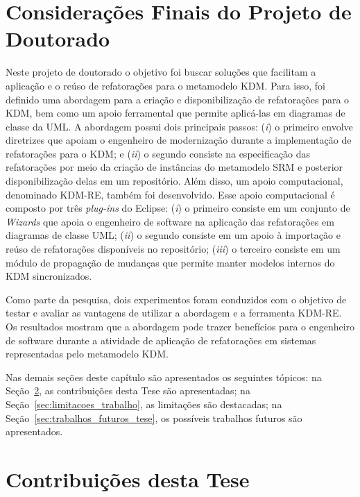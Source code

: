\section{Considerações Finais do Projeto de Doutorado}
Neste projeto de doutorado o objetivo foi buscar soluções que facilitam a aplicação e o reúso de refatorações para o metamodelo KDM. Para isso, foi definido uma abordagem para a criação e disponibilização de refatorações para o KDM, bem como um apoio ferramental que permite aplicá-las em diagramas de classe da UML. A abordagem possui dois principais passos: (\textit{i}) o primeiro envolve diretrizes que apoiam o engenheiro de modernização durante a implementação de refatorações para o KDM; e (\textit{ii}) o segundo consiste na especificação das refatorações por meio da criação de instâncias do metamodelo SRM e posterior disponibilização delas em um repositório. Além disso, um apoio computacional, denominado KDM-RE, também foi desenvolvido. Esse apoio computacional é composto por três \textit{plug-ins} do Eclipse: (\textit{i}) o primeiro consiste em um conjunto de \textit{Wizards} que apoia o engenheiro de software na aplicação das refatorações em diagramas de classe UML; (\textit{ii}) o segundo consiste em um apoio à importação e reúso de refatorações disponíveis no repositório; (\textit{iii}) o terceiro consiste em um módulo de propagação de mudanças que permite manter modelos internos do KDM sincronizados.

Como parte da pesquisa, dois experimentos foram conduzidos com o objetivo de testar e avaliar as vantagens de utilizar a abordagem e a ferramenta KDM-RE. Os resultados mostram que a abordagem pode trazer benefícios para o engenheiro de software durante a atividade de aplicação de refatorações em sistemas representadas pelo metamodelo KDM.

Nas demais seções deste capítulo são apresentados os seguintes tópicos: na Seção~\ref{sec:contribuicoes_desta_tese}, as contribuições desta Tese são apresentadas; na Seção~\ref{sec:limitacoes_trabalho}, as limitações são destacadas; na Seção~\ref{sec:trabalhos_futuros_tese}, os possíveis trabalhos futuros são apresentados.%

\section{Contribuições desta Tese}\label{sec:contribuicoes_desta_tese}

